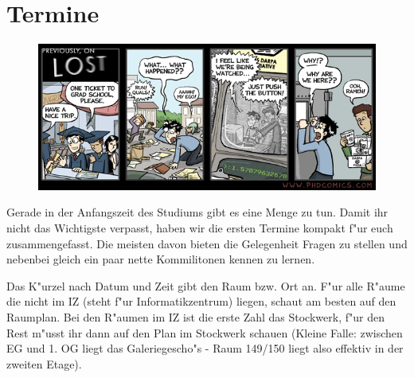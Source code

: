 \section{Termine}

\begin{figure}[b]
  \includegraphics[width=\textwidth ]{bilder/comics/phd092706s.png}
\end{figure}

Gerade in der Anfangszeit des Studiums gibt es eine Menge zu tun. Damit ihr
nicht das Wichtigste verpasst, haben wir die ersten Termine kompakt f"ur
euch zusammengefasst. Die meisten davon bieten die Gelegenheit Fragen zu
stellen und nebenbei gleich ein paar nette Kommilitonen kennen zu lernen.

Das K"urzel nach Datum und Zeit gibt den Raum bzw. Ort an. F"ur alle R"aume die nicht
im IZ (steht f"ur Informatikzentrum) liegen, schaut am besten auf den
Raumplan. Bei den R"aumen im IZ ist die erste Zahl das Stockwerk, f"ur
den Rest m"usst ihr dann auf den Plan im Stockwerk schauen (Kleine Falle:
zwischen EG und 1. OG liegt das Galeriegescho"s - Raum 149/150 liegt also
effektiv in der zweiten Etage).\par

